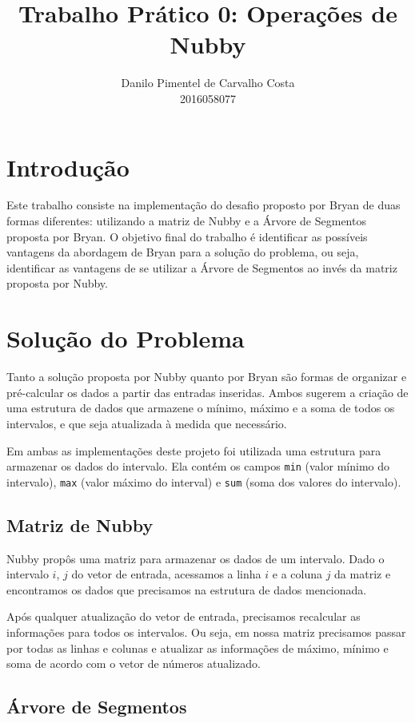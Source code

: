 \documentclass{article}
\title{Trabalho Prático 0: Operações de Nubby}
\author{Danilo Pimentel de Carvalho Costa\\2016058077}
\date{}
\begin{document}
\maketitle

\section{Introdução}

Este trabalho consiste na implementação do desafio proposto por Bryan de duas formas diferentes: utilizando a matriz de Nubby e a Árvore de Segmentos proposta por Bryan. O objetivo final do trabalho é identificar as possíveis vantagens da abordagem de Bryan para a solução do problema, ou seja, identificar as vantagens de se utilizar a Árvore de Segmentos ao invés da matriz proposta por Nubby.

\section{Solução do Problema}

Tanto a solução proposta por Nubby quanto por Bryan são formas de organizar e pré-calcular os dados a partir das entradas inseridas. Ambos sugerem a criação de uma estrutura de dados que armazene o mínimo, máximo e a soma de todos os intervalos, e que seja atualizada à medida que necessário.

Em ambas as implementações deste projeto foi utilizada uma estrutura para armazenar os dados do intervalo. Ela contém os campos \texttt{min} (valor mínimo do intervalo), \texttt{max} (valor máximo do interval) e \texttt{sum} (soma dos valores do intervalo).

\subsection{Matriz de Nubby}

Nubby propôs uma matriz para armazenar os dados de um intervalo. Dado o intervalo $i$, $j$ do vetor de entrada, acessamos a linha $i$ e a coluna $j$ da matriz e encontramos os dados que precisamos na estrutura de dados mencionada.

Após qualquer atualização do vetor de entrada, precisamos recalcular as informações para todos os intervalos. Ou seja, em nossa matriz precisamos passar por todas as linhas e colunas e atualizar as informações de máximo, mínimo e soma de acordo com o vetor de números atualizado.

\subsection{Árvore de Segmentos}
\end{document}
